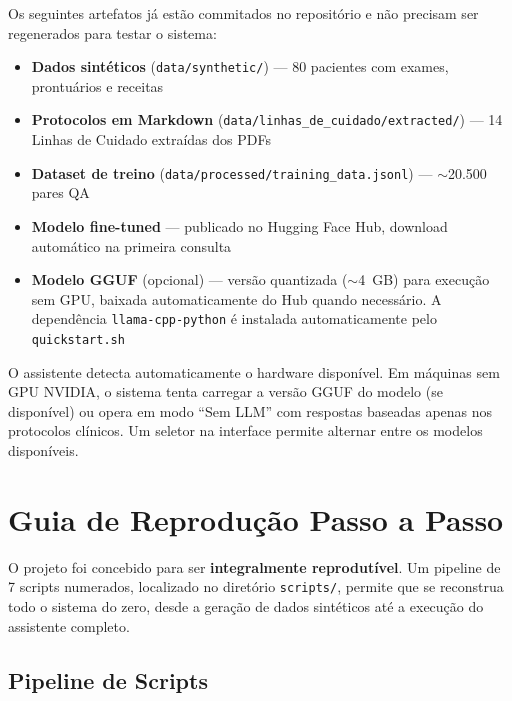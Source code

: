 \begin{infobox}
Os seguintes artefatos já estão commitados no repositório e não precisam ser regenerados para testar o sistema:
\begin{itemize}
    \item \textbf{Dados sintéticos} (\texttt{data/synthetic/}) --- 80 pacientes com exames, prontuários e receitas
    \item \textbf{Protocolos em Markdown} (\texttt{data/linhas\_de\_cuidado/extracted/}) --- 14 Linhas de Cuidado extraídas dos PDFs
    \item \textbf{Dataset de treino} (\texttt{data/processed/training\_data.jsonl}) --- $\sim$20.500 pares QA
    \item \textbf{Modelo fine-tuned} --- publicado no Hugging Face Hub, download automático na primeira consulta
    \item \textbf{Modelo GGUF} (opcional) --- versão quantizada ($\sim$4~GB) para execução sem GPU, baixada automaticamente do Hub quando necessário. A dependência \texttt{llama-cpp-python} é instalada automaticamente pelo \texttt{quickstart.sh}
\end{itemize}
\end{infobox}

\begin{infobox}
O assistente detecta automaticamente o hardware disponível. Em máquinas sem GPU NVIDIA, o sistema tenta carregar a versão GGUF do modelo (se disponível) ou opera em modo ``Sem LLM'' com respostas baseadas apenas nos protocolos clínicos. Um seletor na interface permite alternar entre os modelos disponíveis.
\end{infobox}


\section{Guia de Reprodução Passo a Passo}\label{sec:reproducao}

O projeto foi concebido para ser \textbf{integralmente reprodutível}. Um pipeline de 7 scripts numerados, localizado no diretório \texttt{scripts/}, permite que se reconstrua todo o sistema do zero, desde a geração de dados sintéticos até a execução do assistente completo.

\subsection{Pipeline de Scripts}

